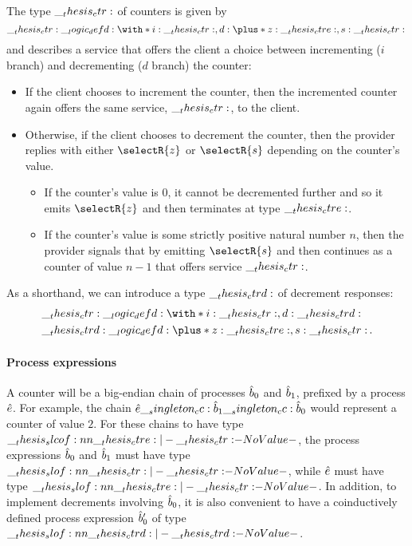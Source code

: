 The type $\__thesis_ctr:$ of counters is given by
\begin{equation*}
  \ctr \defd \with*{ i: \ctr , d: \plus*{ z: \ctre , s: \ctr } }
  \,
\end{equation*}
and describes a service that offers the client a choice between incrementing ($i$ branch) and decrementing ($d$ branch) the counter:
\begin{itemize}
\item
  If the client chooses to increment the counter, then the incremented counter again offers the same service, $\__thesis_ctr:$, to the client.
\item
  Otherwise, if the client chooses to decrement the counter, then the provider replies with either $\selectR{z}$ or $\selectR{s}$ depending on the counter's value.
  \begin{itemize}
  \item
    If the counter's value is $0$, it cannot be decremented further and so it emits $\selectR{z}$ and then terminates at type $\__thesis_ctre:$.
  \item
    If the counter's value is some strictly positive natural number $n$, then the provider signals that by emitting $\selectR{s}$ and then continues as a counter of value $n-1$ that offers service $\__thesis_ctr:$.
  \end{itemize}
\end{itemize}
As a shorthand, we can introduce a type $\__thesis_ctrd:$ of decrement responses:
\begin{equation*}
  \begin{lgathered}
    \ctr \defd \with*{ i: \ctr , d: \ctrd } \\
    \ctrd \defd \plus*{ z: \ctre , s: \ctr }
    \,.
  \end{lgathered}
\end{equation*}

\paragraph*{Process expressions}

A counter will be a big-endian chain of processes $\hat{b}_0$ and $\hat{b}_1$, prefixed by a process $\hat{e}$.
For example, the chain $\hat{e} \__singleton_cc: \hat{b}_1 \__singleton_cc: \hat{b}_0$ would represent a counter of value $2$.
For these chains to have type $\slcof{\ctre |- \ctr}$, the process expressions $\hat{b}_0$ and $\hat{b}_1$ must have type $\slof{\ctr |- \ctr}$, while $\hat{e}$ must have type $\slof{\ctre |- \ctr}$.
%
In addition, to implement decrements involving $\hat{b}_0$, it is also convenient to have a coinductively defined process expression $\hat{b}'_0$ of type $\slof{\ctrd |- \ctrd}$.


